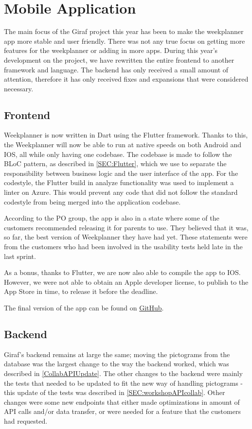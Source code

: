 \section{Mobile Application}
The main focus of the Giraf project this year has been to make the weekplanner app more stable and user friendly.
There was not any true focus on getting more features for the weekplanner or adding in more apps.
During this year's development on the project, we have rewritten the entire frontend to another framework and language.
The backend has only received a small amount of attention, therefore it has only received fixes and expansions that were considered necessary.

\subsection{Frontend}
Weekplanner is now written in Dart using the Flutter framework.
Thanks to this, the Weekplanner will now be able to run at native speeds on both Android and IOS, all while only having one codebase.
The codebase is made to follow the BLoC pattern, as described in \autoref{SEC:Flutter}, which we use to separate the responsibility between business logic and the user interface of the app. 
For the codestyle, the Flutter build in analyze functionality was used to implement a linter on Azure. 
This would prevent any code that did not follow the standard codestyle from being merged into the application codebase.

According to the PO group, the app is also in a state where some of the customers recommended releasing it for parents to use.
They believed that it was, so far, the best version of Weekplanner they have had yet.
These statements were from the customers who had been involved in the usability tests held late in the last sprint.

As a bonus, thanks to Flutter, we are now also able to compile the app to IOS.
However, we were not able to obtain an Apple developer license, to publish to the App Store in time, to release it before the deadline.

The final version of the app can be found on \href{https://github.com/aau-giraf/weekplanner/tree/2019-Final}{GitHub}.


\subsection{Backend}
Giraf's backend remains at large the same; moving the pictograms from the database was the largest change to the way the backend worked, which was described in \autoref{CollabAPIUpdate}.
The other changes to the backend were mainly the tests that needed to be updated to fit the new way of handling pictograms - this update of the tests was described in \autoref{SEC:workshopAPIcollab}.
Other changes were some new endpoints that either made optimizations in amount of API calls and/or data transfer, or were needed for a feature that the customers had requested.


